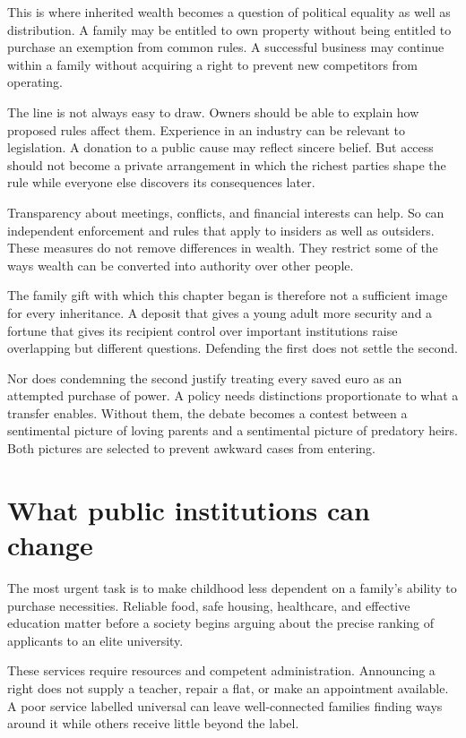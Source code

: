 \documentclass[12pt,a4paper]{book}
\begin{document}
This is where inherited wealth becomes a question of political equality as well as distribution. A family may be entitled to own property without being entitled to purchase an exemption from common rules. A successful business may continue within a family without acquiring a right to prevent new competitors from operating.

The line is not always easy to draw. Owners should be able to explain how proposed rules affect them. Experience in an industry can be relevant to legislation. A donation to a public cause may reflect sincere belief. But access should not become a private arrangement in which the richest parties shape the rule while everyone else discovers its consequences later.

Transparency about meetings, conflicts, and financial interests can help. So can independent enforcement and rules that apply to insiders as well as outsiders. These measures do not remove differences in wealth. They restrict some of the ways wealth can be converted into authority over other people.

The family gift with which this chapter began is therefore not a sufficient image for every inheritance. A deposit that gives a young adult more security and a fortune that gives its recipient control over important institutions raise overlapping but different questions. Defending the first does not settle the second.

Nor does condemning the second justify treating every saved euro as an attempted purchase of power. A policy needs distinctions proportionate to what a transfer enables. Without them, the debate becomes a contest between a sentimental picture of loving parents and a sentimental picture of predatory heirs. Both pictures are selected to prevent awkward cases from entering.

\section*{What public institutions can change}

The most urgent task is to make childhood less dependent on a family's ability to purchase necessities. Reliable food, safe housing, healthcare, and effective education matter before a society begins arguing about the precise ranking of applicants to an elite university.

These services require resources and competent administration. Announcing a right does not supply a teacher, repair a flat, or make an appointment available. A poor service labelled universal can leave well-connected families finding ways around it while others receive little beyond the label.
\end{document}
